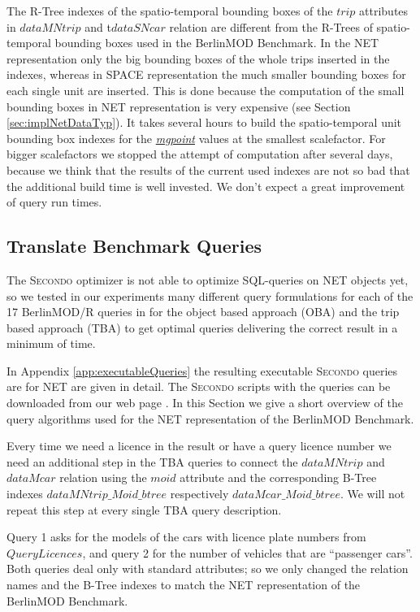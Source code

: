 \documentclass[a4paper]{article}
\newcommand{\secondo}{\textsc{Secondo}}
\newcommand{\bmodb} {BerlinMOD Benchmark}
\newcommand{\dt}[1]{\textsl{\underline{#1}}}
\begin{document}
The R-Tree indexes of the spatio-temporal bounding boxes of the $trip$ attributes
in $dataMNtrip$ and t$dataSNcar$ relation are different from the
R-Trees of spatio-temporal bounding boxes used in the \bmodb{}.
In the NET representation only the big bounding boxes of the whole trips inserted
in the indexes, whereas in SPACE  representation the much smaller bounding boxes
for each single unit are inserted. This is done because the computation of the
small bounding boxes in NET representation is very expensive (see Section
\ref{sec:implNetDataTyp}). It takes several hours to build the spatio-temporal
unit bounding box indexes for the \dt{mgpoint}  values at the smallest scalefactor.
For bigger scalefactors we stopped the attempt of computation after several days,
because we think that the results of the current used indexes are not so bad that
the additional build time is well invested. We don't expect a great improvement
of query run times.
\subsection{Translate Benchmark Queries}
\label{sec:queries}
The \secondo{} optimizer is not able to optimize SQL-queries on NET objects yet,
so we tested in our experiments many different query formulations for each of the
17 BerlinMOD/R queries in for the object based approach (OBA) and the trip based
approach (TBA) to get optimal queries delivering the correct result in a minimum of time.

In Appendix \ref{app:executableQueries} the resulting executable
\secondo{} queries are for NET are given in detail. The \secondo{} scripts with
the queries can be downloaded from our web page \cite{NetworkWeb}.
In this Section we give a short overview of the query algorithms used for the
NET representation of the \bmodb{}.

Every time we need a licence in the result or have a query licence number we need
an additional step in the TBA queries to connect the $dataMNtrip$ and $dataMcar$
relation using the $moid$ attribute and the corresponding B-Tree indexes
$dataMNtrip\_Moid\_btree$ respectively $dataMcar\_Moid\_btree$.
We will not repeat this step at every single TBA query description.

Query 1 asks for the models of the cars with licence plate numbers from $QueryLicences$,
and query 2 for the number of vehicles that are ``passenger cars''. Both queries
deal only with standard attributes; so we only changed the relation names and the
B-Tree indexes to match the NET representation of the \bmodb{}.
\end{document}

